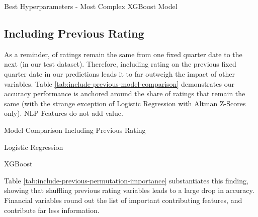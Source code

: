 \documentclass{article}[11pt]
\begin{document}
    \begin{table}[h!]
        \centering
        \caption{Best Hyperparameters - Most Complex XGBoost Model}
        
        \label{tab:xgboost-most-complex-best-params}
    \end{table}

    \clearpage
    \newpage

    \subsection{Including Previous Rating}

    \label{sec:include-previous-rating}

    As a reminder, \shareNotChanges \space of ratings remain the same from one fixed quarter date to the next (\shareNotChangesTest \space in our test dataset). Therefore, including rating on the previous fixed quarter date in our predictions leads it to far outweigh the impact of other variables. Table \ref{tab:include-previous-model-comparison} demonstrates our accuracy performance is anchored around the share of ratings that remain the same (with the strange exception of Logistic Regression with Altman Z-Scores only). NLP Features do not add value.

    \begin{table}[h!]
        \centering
        \caption{Model Comparison Including Previous Rating}
        \begin{minipage}[c]{0.495\linewidth}
            \centering
            
            \caption*{\footnotesize Logistic Regression} 
        \end{minipage}
        \begin{minipage}[c]{0.495\linewidth}
            \centering
            
            \caption*{\footnotesize XGBoost} 
        \end{minipage}
        \label{tab:include-previous-model-comparison}
    \end{table}

    Table \ref{tab:include-previous-permutation-importance} substantiates this finding, showing that shuffling previous rating variables leads to a large drop in accuracy. Financial variables round out the list of important contributing features, and contribute far less information.
\end{document}
